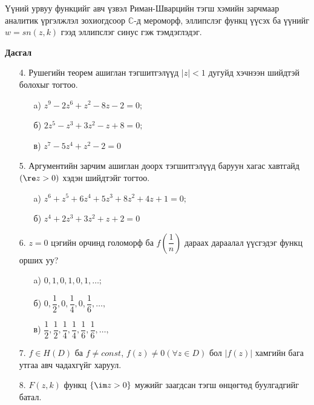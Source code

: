 Үүний урвуу функцийг авч үзвэл Риман-Шварцийн тэгш хэмийн зарчмаар аналитик үргэлжлэл зохиогдсоор $\mathbb{C}$-д мероморф, эллипслэг функц үүсэх ба үүнийг $w=sn (z,k)$ гээд эллипслэг синус гэж тэмдэглэдэг.
\begin{center}
   \textbf{ Дасгал}
\end{center}
\begin{enumerate}
    \item [4.] Рушегийн теорем ашиглан тэгшитгэлүүд $|z|<1$ дугуйд хэчнээн шийдтэй болохыг тогтоо.
    \begin{enumerate}
        \item [a)] $z^9-2z^6+z^2-8z-2=0;$
        \item [б)] $2z^5-z^3+3z^2-z+8=0;$
        \item [в)] $z^7-5z^4+z^2-2=0$
    \end{enumerate}
    \item [5.] Аргументийн зарчим ашиглан доорх тэгшитгэлүүд баруун хагас хавтгайд $(\re z>0)$ хэдэн шийдтэйг тогтоо.
    \begin{enumerate}
        \item [a)] $z^6+z^5+6z^4+5z^3+8z^2+4z+1=0;$
        \item [б)] $z^4+2z^3+3z^2+z+2=0$
    \end{enumerate}
    \item [6.] $z=0$ цэгийн орчинд голоморф ба $f\left(\dfrac{1}{n}\right)$ дараах дараалал үүсгэдэг функц орших уу?
    \begin{enumerate}
        \item [a)] $0,1,0,1,0,1,\ldots ;$
        \item [б)] $0,\dfrac{1}{2},0, \dfrac{1}{4},0,\dfrac{1}{6}, \ldots ,$
        \item [в)] $\dfrac{1}{2},\dfrac{1}{2},\dfrac{1}{4}, \dfrac{1}{4},\dfrac{1}{6},\dfrac{1}{6}, \ldots ,$
    \end{enumerate}
    \item [7.] $f\in H(D)$ ба $f\neq const$, $f(z)\neq 0 (\forall z\in D)$ бол $|f(z)|$ хамгийн бага утгаа авч чадахгүйг харуул.
    \item [8.] $F(z,k)$ функц $\{\im z>0\}$ мужийг заагдсан тэгш өнцөгтөд буулгадгийг батал.
\end{enumerate}